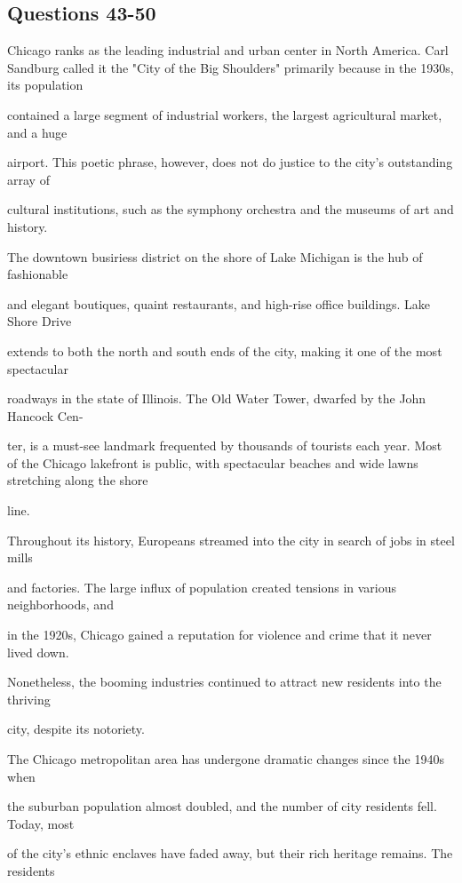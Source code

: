 \documentclass[12pt]{article}
\begin{document}
\subsection*{Questions 43-50}
\begingroup
\small
\sloppy
\setlength{\parskip}{0pt}
\setlength{\parindent}{0pt}
Chicago ranks as the leading industrial and urban center in North America. Carl Sandburg called it the "City of the Big Shoulders" primarily because in the 1930s, its population\par
contained a large segment of industrial workers, the largest agricultural market, and a huge\par
airport. This poetic phrase, however, does not do justice to the city's outstanding array of\par
cultural institutions, such as the symphony orchestra and the museums of art and history.\par
The downtown busiriess district on the shore of Lake Michigan is the hub of fashionable\par
and elegant boutiques, quaint restaurants, and high-rise office buildings. Lake Shore Drive\par
extends to both the north and south ends of the city, making it one of the most spectacular\par
roadways in the state of Illinois. The Old Water Tower, dwarfed by the John Hancock Cen-\par
ter, is a must-see landmark frequented by thousands of tourists each year. Most of the Chicago lakefront is public, with spectacular beaches and wide lawns stretching along the shore\par
line.\par
Throughout its history, Europeans streamed into the city in search of jobs in steel mills\par
and factories. The large influx of population created tensions in various neighborhoods, and\par
in the 1920s, Chicago gained a reputation for violence and crime that it never lived down.\par
Nonetheless, the booming industries continued to attract new residents into the thriving\par
city, despite its notoriety.\par
The Chicago metropolitan area has undergone dramatic changes since the 1940s when\par
the suburban population almost doubled, and the number of city residents fell. Today, most\par
of the city's ethnic enclaves have faded away, but their rich heritage remains. The residents\par
\end{document}

